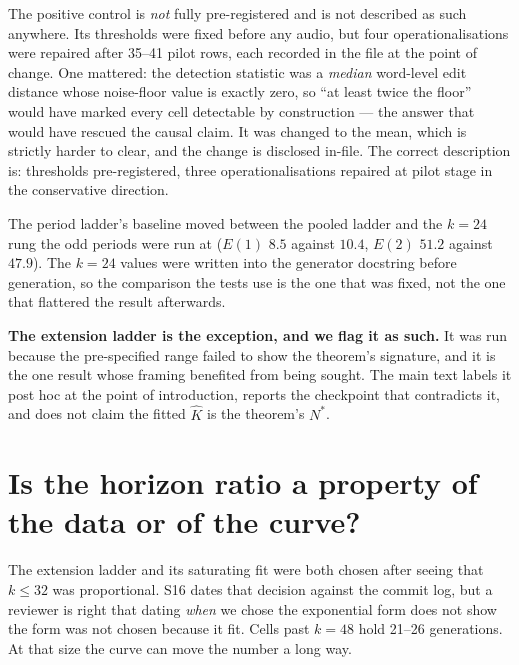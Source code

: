 \documentclass[11pt]{article}
\begin{document}
The positive control is \emph{not} fully pre-registered and is not described as
such anywhere. Its thresholds were fixed before any audio, but four
operationalisations were repaired after 35--41 pilot rows, each recorded in the
file at the point of change. One mattered: the detection statistic was a
\emph{median} word-level edit distance whose noise-floor value is exactly zero,
so ``at least twice the floor'' would have marked every cell detectable by
construction --- the answer that would have rescued the causal claim. It was
changed to the mean, which is strictly harder to clear, and the change is
disclosed in-file. The correct description is: thresholds pre-registered, three
operationalisations repaired at pilot stage in the conservative direction.

The period ladder's baseline moved between the pooled ladder and the $k{=}24$
rung the odd periods were run at ($E(1)$ $8.5$ against $10.4$, $E(2)$ $51.2$
against $47.9$). The $k{=}24$ values were written into the generator docstring
before generation, so the comparison the tests use is the one that was fixed,
not the one that flattered the result afterwards.

\noindent\textbf{The extension ladder is the exception, and we flag it as such.}
It was run because the pre-specified range failed to show the theorem's
signature, and it is the one result whose framing benefited from being sought.
The main text labels it post hoc at the point of introduction, reports the
checkpoint that contradicts it, and does not claim the fitted $\hat K$ is the
theorem's $N^\ast$.

\section{Is the horizon ratio a property of the data or of the curve?}

The extension ladder and its saturating fit were both chosen after seeing that
$k\le32$ was proportional. S16 dates that decision against the commit log, but a
reviewer is right that dating \emph{when} we chose the exponential form does not
show the form was not chosen because it fit. Cells past $k=48$ hold 21--26
generations. At that size the curve can move the number a long way.
\end{document}
